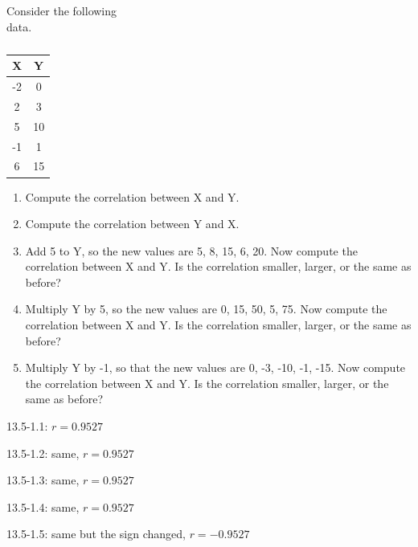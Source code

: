 \documentclass[11pt, chapterprefix=true]{scrbook}\usepackage[]{graphicx}\usepackage[]{color}
\begin{document}
\begin{exercises}

\begin{exercise}  %

Consider the following \\ data.
	\begin{table}[ht] 
		\caption{}
		\begin{center}
		\begin{tabular}{c c}
		\textbf{X} & \textbf{Y}\\ \hline
		-2 & 0\\
		2 & 3\\
		5 & 10\\
		-1 & 1\\
		6 & 15\\ \hline
		\end{tabular}
		\end{center}
	\end{table}
	\begin{enumerate}
		\item Compute the correlation between X and Y.
		\item Compute the correlation between Y and X.
		\item Add 5 to Y, so the new values are 5, 8, 15, 6, 20. Now compute the correlation between X and Y. Is the correlation smaller, larger, or the same as before?
		\item Multiply Y by 5, so the new values are 0, 15, 50, 5, 75. Now compute the correlation between X and Y. Is the correlation smaller, larger, or the same as before?
		\item Multiply Y by -1, so that the new values are 0, -3, -10, -1, -15. Now compute the correlation between X and Y. Is the correlation smaller, larger, or the same as before?
	\end{enumerate}
\end{exercise}
\begin{solution}  %



13.5-1.1: $r = 0.9527 $ 

13.5-1.2: same, $r = 0.9527 $ 

13.5-1.3: same, $r = 0.9527 $ 

13.5-1.4: same, $r = 0.9527 $ 

13.5-1.5: same but the sign changed, $r = -0.9527 $ 

\end{solution}

\begin{exercise} %


\end{exercise}
\end{exercises}
\end{document}
